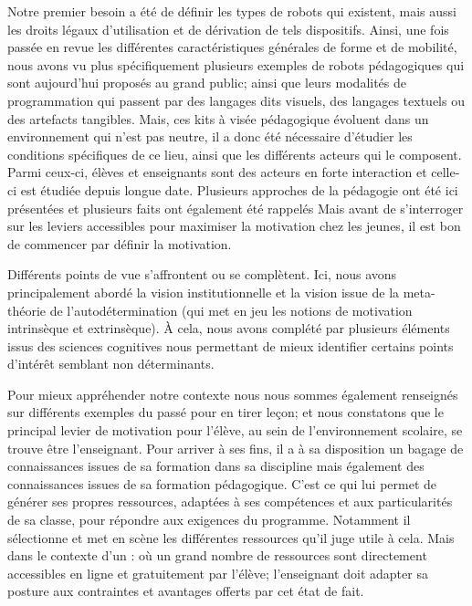 \begin{concluPart}
Notre premier besoin a été de définir les types de robots qui existent, mais aussi les droits légaux d'utilisation et de dérivation de tels dispositifs. 
Ainsi, une fois passée en revue les différentes caractéristiques générales de forme et de mobilité, nous avons vu plus spécifiquement plusieurs exemples de robots pédagogiques  qui sont aujourd'hui proposés au grand public; ainsi que leurs modalités de programmation qui passent par des langages dits visuels, des langages textuels ou des artefacts tangibles.
Mais, ces kits à visée pédagogique évoluent dans un environnement qui n'est pas neutre, il a donc été nécessaire d'étudier les conditions spécifiques de ce lieu, ainsi que les différents acteurs qui le composent. Parmi ceux-ci, élèves et enseignants  sont des acteurs en forte interaction et celle-ci est étudiée depuis longue date.
Plusieurs approches de la pédagogie ont été ici présentées et plusieurs faits ont également été rappelés
Mais avant de s'interroger sur les leviers accessibles pour maximiser la motivation chez les jeunes, il est bon de commencer par définir la motivation.\par%
Différents points de vue s'affrontent ou se complètent. Ici, nous avons principalement abordé la vision institutionnelle et la vision issue de la meta-théorie de l'autodétermination (qui met en jeu les notions de motivation intrinsèque et extrinsèque). À cela, nous avons complété par plusieurs éléments issus des sciences cognitives nous permettant de mieux identifier certains points d'intérêt semblant  non déterminants.\par%
Pour mieux appréhender notre contexte  nous nous sommes également renseignés sur différents exemples du passé pour en tirer leçon; et nous constatons que le principal levier de motivation pour l'élève, au sein de l'environnement scolaire, se trouve être l'enseignant.
Pour arriver à ses fins, il a à sa disposition un bagage de connaissances issues de sa formation dans sa discipline mais également des connaissances issues de sa formation pédagogique. C'est ce qui lui permet de générer ses propres ressources, adaptées à ses compétences et aux particularités de sa classe, pour répondre aux exigences du programme.
Notamment il sélectionne et met en scène les différentes ressources qu'il juge utile à cela.
Mais dans le contexte d'un : où un grand nombre de ressources sont directement accessibles en ligne et gratuitement par l'élève; l'enseignant doit adapter sa posture aux contraintes et avantages offerts par cet état de fait.\par%

\end{concluPart}
